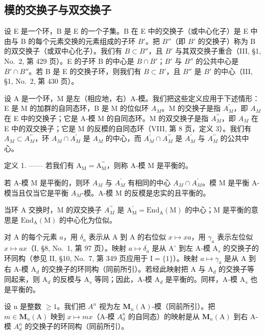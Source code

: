 \subsection{模的交换子与双交换子}

设 E 是一个环，B 是 E 的一个子集。B 在 E 中的交换子（或中心化子）是 E 中由与 B 的每个元素交换的元素组成的子环 \(B'\)。把 \(B''\)（即 \(B'\) 的交换子）称为 B 的双交换子（或双中心化子）。我们有 \(B \subset B''\)，且 \(B'\) 与其双交换子重合（III, §1, No.~2, 第 429 页）。E 的子环 B 的中心是 \(B \cap B'\)；\(B'\) 与 \(B''\) 的公共中心是 \(B' \cap B''\)。若 B 是 E 的交换子环，则我们有 \(B \subset B'\)，且 \(B''\) 是 \(B'\) 的中心（III, §1, No.~2, 第 430 页）。

设 A 是一个环，M 是左（相应地，右）A-模。我们把这些定义应用于下述情形：E 是 M 的加群的自同态环，B 是 M 的位似环 \(A_{M}\)。M 的交换子是指 \(A_{M}^{\prime}\)，即 \(A_{M}\) 在 E 中的交换子；它是 A-模 M 的自同态环。M 的双交换子是指 \(A_{M}^{\prime\prime}\)，即 \(A_{M}\) 在 E 中的双交换子；它是 M 的反模的自同态环（VIII, 第 8 页，定义 3）。我们有 \(A_{M} \subset A_{M}^{\prime\prime}\)，环 \(A_{M} \cap A_{M}^{\prime}\) 是 \(A_{M}\) 的中心，而 \(A_{M}^{\prime} \cap A_{M}^{\prime\prime}\) 是 \(A_{M}^{\prime}\) 与 \(A_{M}^{\prime\prime}\) 的公共中心。

定义 1. —— 若我们有 \(\mathrm{A}_{\mathrm{M}} = \mathrm{A}_{\mathrm{M}}^{\prime \prime}\)，则称 A-模 M 是平衡的。

若 A-模 M 是平衡的，则环 \(A_{M}\) 与 \(A_{M}^{\prime}\) 有相同的中心 \(A_{M} \cap A_{M}^{\prime}\)。模 M 是平衡 A-模当且仅当它是平衡 \(A_{M}\)-模。A-模 M 的反模是忠实的且平衡的。

当环 A 交换时，M 的双交换子 \(A_{M}^{\prime\prime}\) 是 \(\mathrm{A}_{\mathrm{M}}^{\prime}=\mathrm{End}_{\mathrm{A}}(\mathrm{M})\) 的中心；M 是平衡的意思是 \(\mathrm{End}_{\mathrm{A}}(\mathrm{M})\) 的中心化为位似。

对 A 的每个元素 \(a\)，用 \(\delta_{a}\) 表示从 A 到 A 的右位似 \(x\mapsto xa\)，用 \(\gamma_{a}\) 表示左位似 \(x\mapsto ax\)（I, §8, No.~1, 第 97 页）。映射 \(a\mapsto \delta_{a}\) 是从 \(\mathrm{A}^{\circ}\) 到左 A-模 \(\mathrm{A}_s\) 的交换子的环同构（参见 II, §10, No.~7, 第 349 页应用于 \(\mathrm{I} = \{1\}\)）。映射 \(a\mapsto \gamma_{a}\) 是从 A 到右 A-模 \(\mathrm{A}_d\) 的交换子的环同构（同前所引）。若经此映射把 A 与 \(\mathrm{A}_d\) 的交换子等同起来，则 \(\mathrm{A}_d\) 的反模与 \(\mathrm{A}_s\) 等同；因此，A-模 \(\mathrm{A}_d\) 是平衡的。同样，A-模 \(\mathrm{A}_s\) 也是平衡的。

设 n 是整数 \(\geqslant 1\)。我们把 \(A^{n}\) 视为左 \(\mathbf{M}_{n}(\mathrm{A})\)-模（同前所引）。把 \(m \in \mathbf{M}_{n}(\mathrm{A})\) 映到 \(x \mapsto mx\)（A-模 \(A_{d}^{n}\) 的自同态）的映射是从 \(\mathbf{M}_{n}(\mathrm{A})\) 到右 A-模 \(A_{d}^{n}\) 的交换子的环同构（同前所引）。

